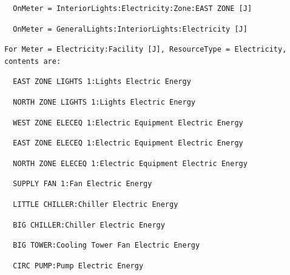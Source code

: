 \begin{lstlisting}
  OnMeter = InteriorLights:Electricity:Zone:EAST ZONE [J]
\end{lstlisting}

\begin{lstlisting}
  OnMeter = GeneralLights:InteriorLights:Electricity [J]
\end{lstlisting}

\begin{lstlisting}
For Meter = Electricity:Facility [J], ResourceType = Electricity, contents are:
\end{lstlisting}

\begin{lstlisting}
  EAST ZONE LIGHTS 1:Lights Electric Energy
\end{lstlisting}

\begin{lstlisting}
  NORTH ZONE LIGHTS 1:Lights Electric Energy
\end{lstlisting}

\begin{lstlisting}
  WEST ZONE ELECEQ 1:Electric Equipment Electric Energy
\end{lstlisting}

\begin{lstlisting}
  EAST ZONE ELECEQ 1:Electric Equipment Electric Energy
\end{lstlisting}

\begin{lstlisting}
  NORTH ZONE ELECEQ 1:Electric Equipment Electric Energy
\end{lstlisting}

\begin{lstlisting}
  SUPPLY FAN 1:Fan Electric Energy
\end{lstlisting}

\begin{lstlisting}
  LITTLE CHILLER:Chiller Electric Energy
\end{lstlisting}

\begin{lstlisting}
  BIG CHILLER:Chiller Electric Energy
\end{lstlisting}

\begin{lstlisting}
  BIG TOWER:Cooling Tower Fan Electric Energy
\end{lstlisting}

\begin{lstlisting}
  CIRC PUMP:Pump Electric Energy
\end{lstlisting}

